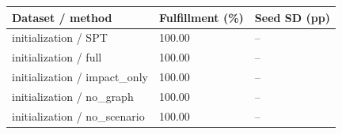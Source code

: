 \begin{tabular}{lll}
\toprule
Dataset / method & Fulfillment (\%) & Seed SD (pp)\\
\midrule
initialization / SPT & 100.00 & --\\
initialization / full & 100.00 & --\\
initialization / impact\_only & 100.00 & --\\
initialization / no\_graph & 100.00 & --\\
initialization / no\_scenario & 100.00 & --\\
\bottomrule
\end{tabular}